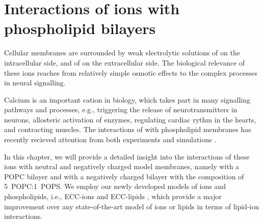 \chapter{Interactions of ions with phospholipid bilayers}
\label{chap:results}

Cellular membranes are surrounded by 
weak electrolytic solutions of  on the intracellular side, 
and of  on the extracellular side. 
The biological relevance of these ions reaches from relatively simple osmotic effects to the complex processes in neural signalling. \citep{Knudsen_book2002} 

Calcium is an important cation in biology, 
which takes part in many signalling pathways and processes, 
e.g., triggering the release of neurotransmitters in neurons, 
allosteric activation of enzymes, 
regulating cardiac rythm in the hearts, and contracting muscles. \citep{Wang2000, Michalak2002, Glancy2013, Chouhan2012, Berridge2003, Clapham2007, Annunziata2013, timr2018calcium}
The interactions of  with phospholipid membranes has recently recieved attention from both experiments and simulations \citep{melcrova16, javanainen17, catte16, melcr18, magarkar2017, fink2017osmotic, ye2018phosphatidylinositol}.



In this chapter, we will provide a detailed insight into the interactions of these ions with neutral and negatively charged model membranes,
namely with a POPC bilayer and with a negatively charged bilayer with the composition of 5~POPC:1~POPS. 
We employ our newly developed models of ions and phospholipids, 
i.e.,
ECC-ions \citep{martinek17, kohagen16, Pluharova2014} and ECC-lipids \citep{melcr18}, 
which provide a major improvement over any state-of-the-art model of ions or lipids in terms of lipid-ion interactions. 

